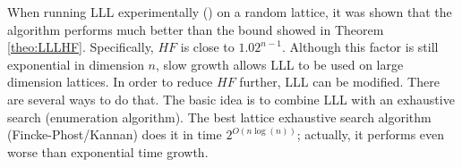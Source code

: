 

When running LLL experimentally (\cite{nguyen2006lll}) on a random lattice, it
was shown that the algorithm performs much better than the bound showed in
Theorem \ref{theo:LLLHF}. Specifically, $HF$ is close to $1.02^{n-1}$. Although
this factor is still exponential in dimension $n$, slow growth allows LLL to be
used on large dimension lattices. In order to reduce $HF$ further, LLL can be
modified. There are several ways to do that. The basic idea is to combine LLL
with an exhaustive search (enumeration algorithm). The best lattice exhaustive
search algorithm (Fincke-Phost/Kannan) does it in time $2^{O(n\log(n))}$;
actually, it performs even worse than exponential time growth.

